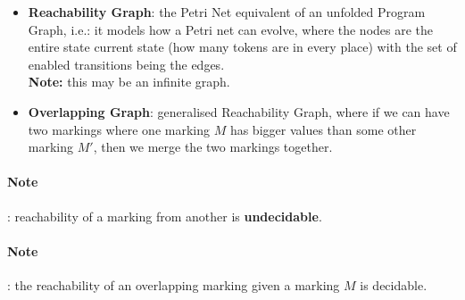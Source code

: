 \documentclass{article}
\begin{document}
\begin{itemize}
\item \textbf{Reachability Graph}: the Petri Net equivalent of an unfolded
  Program Graph, i.e.: it models how a Petri net can evolve, where the nodes are
  the entire state current state (how many tokens are in every place) with the
  set of enabled transitions being the edges. \\
  \textbf{Note:} this may be an infinite graph.
\item \textbf{Overlapping Graph}: generalised Reachability Graph, where if we
  can have two markings where one marking $M$ has bigger values than some other
  marking $M'$, then we merge the two markings together.
\end{itemize}

\paragraph{Note}: reachability of a marking from another is
\textbf{undecidable}.
\paragraph{Note}: the reachability of an overlapping marking given a marking $M$
is decidable.
\end{document}

